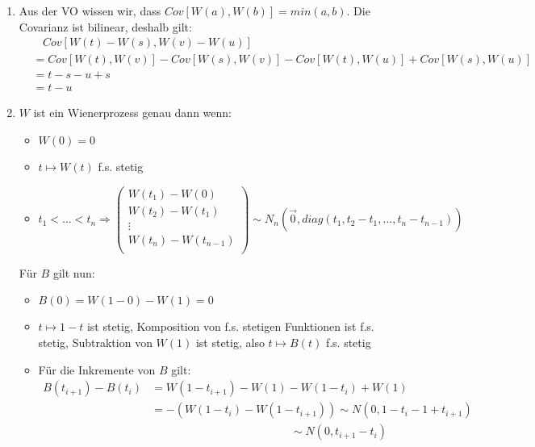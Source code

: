 \documentclass[11pt,a4paper,fullpage]{article}
\begin{document}
\begin{enumerate}
\item Aus der VO wissen wir, dass $Cov\left[W\left(a\right), W\left(b\right)\right] = min\left(a,b\right)$. Die Covarianz ist bilinear, deshalb gilt:
\begin{align*}
&~~~~Cov\left[W\left(t\right) - W\left(s\right), W\left(v\right) - W\left(u\right)\right]\\
&= Cov\left[W\left(t\right), W\left(v\right)\right] - Cov\left[W\left(s\right), W\left(v\right)\right] - Cov\left[W\left(t\right), W\left(u\right)\right] + Cov\left[W\left(s\right), W\left(u\right)\right] \\
&= t - s - u + s \\
&= t - u
\end{align*}

\item $W$ ist ein Wienerprozess genau dann wenn:
\begin{itemize}
\item $W\left(0\right) = 0$
\item $t \mapsto W\left(t\right)$ f.s. stetig
\item $t_1 < \hdots < t_n \Rightarrow
\begin{pmatrix*}
W\left(t_1\right) - W\left(0\right) \\
W\left(t_2\right) - W\left(t_1\right) \\
\vdots \\
W\left(t_n\right) - W\left(t_{n-1}\right) \\
\end{pmatrix*} \sim N_n\left(\vec 0, diag\left(t_1, t_2-t_1, \hdots, t_n - t_{n-1}\right)\right)$
\end{itemize}
Für $B$ gilt nun:
\begin{itemize}
\item $B\left(0\right) = W\left(1-0\right) - W\left(1\right) = 0$
\item $t \mapsto 1 - t$ ist stetig, Komposition von f.s. stetigen Funktionen ist f.s. stetig, Subtraktion von $W\left(1\right)$ ist stetig, also $t \mapsto B\left(t\right)$ f.s. stetig
\item Für die Inkremente von $B$ gilt:
\begin{align*}
B\left(t_{i+1}\right) - B\left(t_i\right) &= W\left(1 - t_{i+1}\right) - W\left(1\right) - W\left(1 - t_i\right) + W\left(1\right) \\
&= - \left(W\left(1 - t_i\right) - W\left(1 - t_{i+1}\right)\right) \sim N\left(0, 1 - t_i - 1 + t_{i+1}\right) \\
&\hspace{148pt}\sim N\left(0, t_{i+1} - t_i\right)

\end{align*}
\end{itemize}
\end{enumerate}
\end{document}
